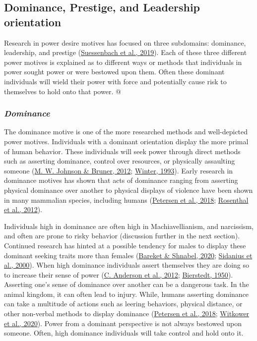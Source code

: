 \documentclass[
  donotrepeattitle,doc, 12pt, a4paper,floatsintext]{apa7}
\begin{document}
\hypertarget{dominance-prestige-and-leadership-orientation-1}{%
\subsection{Dominance, Prestige, and Leadership orientation}\label{dominance-prestige-and-leadership-orientation-1}}

Research in power desire motives has focused on three subdomains: dominance, leadership, and prestige (\protect\hyperlink{ref-suessenbach2019}{Suessenbach et al., 2019}). Each of these three different power motives is explained as to different ways or methods that individuals in power sought power or were bestowed upon them. Often these dominant individuals will wield their power with force and potentially cause risk to themselves to hold onto that power. @

\hypertarget{dominance}{%
\subsubsection{\texorpdfstring{\emph{Dominance}}{Dominance}}\label{dominance}}

The dominance motive is one of the more researched methods and well-depicted power motives. Individuals with a dominant orientation display the more primal of human behavior. These individuals will seek power through direct methods such as asserting dominance, control over resources, or physically assaulting someone (\protect\hyperlink{ref-johnson2012}{M. W. Johnson \& Bruner, 2012}; \protect\hyperlink{ref-winter1993}{Winter, 1993}). Early research in dominance motives has shown that acts of dominance ranging from asserting physical dominance over another to physical displays of violence have been shown in many mammalian species, including humans (\protect\hyperlink{ref-petersen2018}{Petersen et al., 2018}; \protect\hyperlink{ref-rosenthal2012}{Rosenthal et al., 2012}).

Individuals high in dominance are often high in Machiavellianism, and narcissism, and often are prone to risky behavior (discussion further in the next section). Continued research has hinted at a possible tendency for males to display these dominant seeking traits more than females (\protect\hyperlink{ref-bareket2020}{Bareket \& Shnabel, 2020}; \protect\hyperlink{ref-sidanius2000}{Sidanius et al., 2000}). When high dominance individuals assert themselves they are doing so to increase their sense of power (\protect\hyperlink{ref-anderson2012}{C. Anderson et al., 2012}; \protect\hyperlink{ref-bierstedt1950}{Bierstedt, 1950}). Asserting one's sense of dominance over another can be a dangerous task. In the animal kingdom, it can often lead to injury. While, humans asserting dominance can take a multitude of actions such as leering behaviors, physical distance, or other non-verbal methods to display dominance (\protect\hyperlink{ref-petersen2018}{Petersen et al., 2018}; \protect\hyperlink{ref-witkower2020}{Witkower et al., 2020}). Power from a dominant perspective is not always bestowed upon someone. Often, high dominance individuals will take control and hold onto it.
\end{document}
